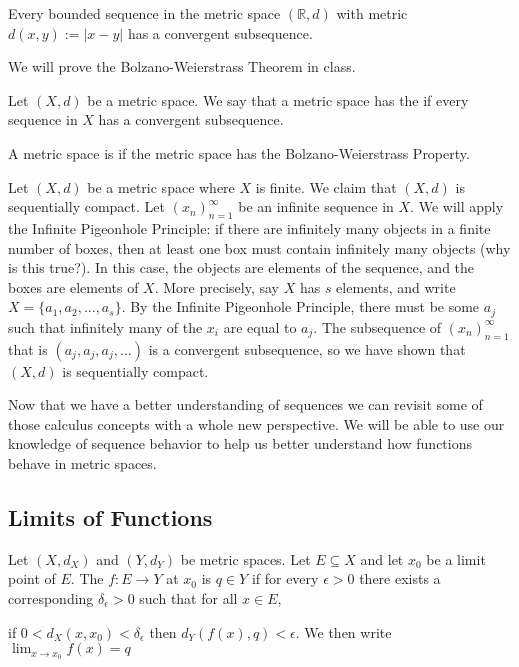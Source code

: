 \documentclass[../main.tex]{subfiles}
\begin{document}
\begin{theorem} Every bounded sequence in the metric space $(\mathbb{R}, d)$ with metric $d(x,y) := |x - y|$ has a convergent subsequence. 
\end{theorem}

\noindent We will prove the Bolzano-Weierstrass Theorem in class. 

\begin{definition}
    Let $(X,d)$ be a metric space. We say that a metric space has the  if every sequence in $X$ has a convergent subsequence.  
\end{definition}
\begin{definition}
    A metric space is  if the metric space has the Bolzano-Weierstrass Property.
\end{definition}

\begin{example}
    Let $(X, d)$ be a metric space where $X$ is finite. We claim that $(X, d)$ is sequentially compact. Let $(x_n)_{n=1}^{\infty}$ be an infinite sequence in $X$. We will apply the Infinite Pigeonhole Principle: if there are infinitely many objects in a finite number of boxes, then at least one box must contain infinitely many objects (why is this true?). In this case, the objects are elements of the sequence, and the boxes are elements of $X$. More precisely, say $X$ has $s$ elements, and write $X = \{a_1, a_2, \dotsc, a_s\}$. By the Infinite Pigeonhole Principle, there must be some $a_j$ such that infinitely many of the $x_i$ are equal to $a_j$. The subsequence of $(x_n)_{n=1}^{\infty}$ that is $(a_j, a_j, a_j, \dotsc)$ is a convergent subsequence, so we have shown that $(X, d)$ is sequentially compact.
\end{example}



\noindent Now that we have a better understanding of sequences we can revisit some of those calculus concepts with a whole new perspective. We will be able to use our knowledge of sequence behavior to help us better understand how functions behave in metric spaces.
\subsection{Limits of Functions}

\begin{definition}[limit]
Let $(X,d_X)$ and $(Y,d_Y)$ be metric spaces. Let $E \subseteq X$ and let $x_0$ be a limit point of $E$. The  $f:E \rightarrow Y$ at $x_0$ is $q \in Y$ if for every $\epsilon > 0$ there exists a corresponding $\delta_{\epsilon} > 0$ such that for all $x \in E$,
\begin{center}
if $0<d_X(x,x_0) < \delta_{\epsilon}$ then $d_Y(f(x), q) < \epsilon$. We then write $\lim_{x \to x_0}f(x)= q$
\end{center}
\end{definition}
\end{document}
